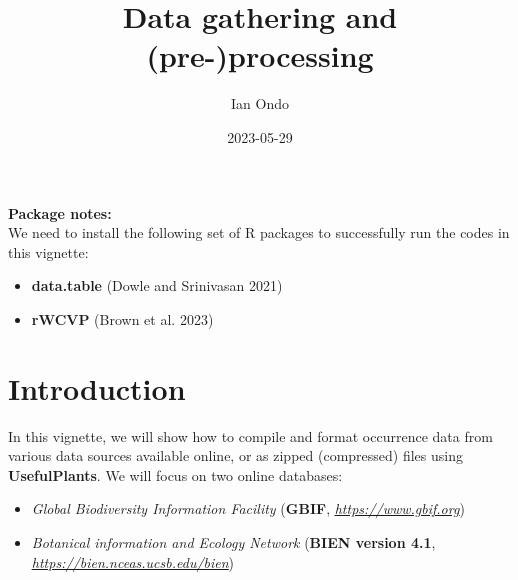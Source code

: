 \documentclass[
]{article}
\title{Data gathering and (pre-)processing}
\author{Ian Ondo}
\date{2023-05-29}
\providecommand{\tightlist}{%
  \setlength{\itemsep}{0pt}\setlength{\parskip}{0pt}}
\begin{document}
\maketitle

{
\setcounter{tocdepth}{2}
\tableofcontents
}
\begin{warningbox}

\textbf{Package notes:}\\
We need to install the following set of R packages to successfully run
the codes in this vignette:

\begin{itemize}
\tightlist
\item
  \textbf{data.table} (Dowle and Srinivasan 2021)
\item
  \textbf{rWCVP} (Brown et al. 2023)
\end{itemize}

\end{warningbox}

\hypertarget{introduction}{%
\section{Introduction}\label{introduction}}

In this vignette, we will show how to compile and format occurrence data
from various data sources available online, or as zipped (compressed)
files using \textbf{UsefulPlants}. We will focus on two online
databases:

\begin{itemize}
\item
  \emph{Global Biodiversity Information Facility} (\textbf{GBIF},
  \href{https://www.gbif.org}{\emph{\underline{https://www.gbif.org}}})
\item
  \emph{Botanical information and Ecology Network} (\textbf{BIEN version
  4.1},
  \href{https://bien.nceas.ucsb.edu/bien}{\emph{\underline{https://bien.nceas.ucsb.edu/bien}}})
\end{itemize}
\end{document}

